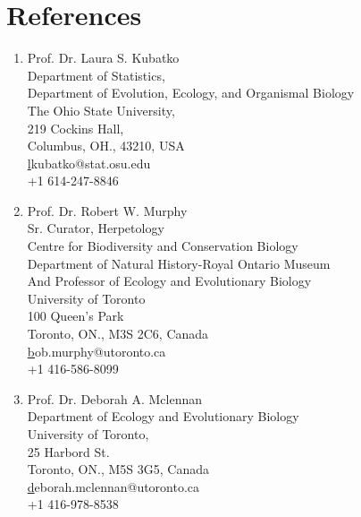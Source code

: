 \documentclass[10pt]{article}
\begin{document}
\newpage

\section*{References}

\begin{enumerate}

\item Prof. Dr. Laura S. Kubatko\\Department of Statistics,\\Department of Evolution, Ecology, and Organismal Biology\\The Ohio State University,\\219 Cockins Hall,\\Columbus, OH., 43210, USA\\\href{lkubatko@stat.osu.edu}lkubatko@stat.osu.edu\\+1 614-247-8846\\

\item Prof. Dr. Robert W. Murphy\\Sr. Curator, Herpetology\\Centre for Biodiversity and Conservation Biology\\Department of Natural History-Royal Ontario Museum\\And Professor of Ecology and Evolutionary Biology\\ University of Toronto\\100 Queen’s Park\\Toronto, ON., M3S 2C6, Canada\\\href{bob.murphy@utoronto.ca}bob.murphy@utoronto.ca\\+1 416-586-8099

\item Prof. Dr. Deborah A. Mclennan\\Department of Ecology and Evolutionary Biology\\University of Toronto,\\25 Harbord St.\\Toronto, ON., M5S 3G5, Canada \\\href{deborah.mclennan@utoronto.ca}deborah.mclennan@utoronto.ca\\+1 416-978-8538
\end{enumerate}









\end{document}

